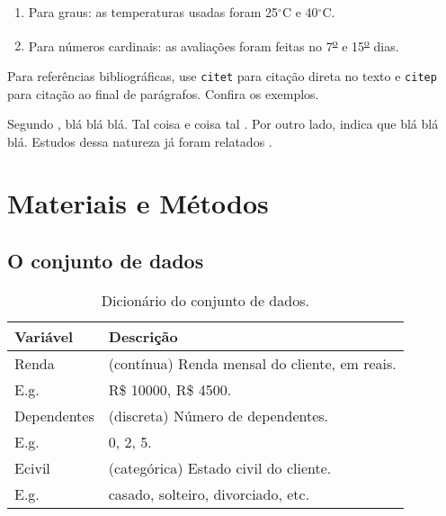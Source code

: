 \documentclass[9pt, a4paper, twocolumn]{article}
\begin{document}
\begin{enumerate}
\item Para graus: as temperaturas usadas foram 25$^{\circ}$C e 40$^{\circ}$C.
\item Para números cardinais: as avaliações foram feitas no
  7\textsuperscript{\underline{o}} e 15\textsuperscript{\underline{o}}
  dias.
\end{enumerate}

Para referências bibliográficas, use \texttt{citet} para citação direta
no texto e \texttt{citep} para citação ao final de parágrafos. Confira os
exemplos.

Segundo \citet{wickham2016r}, blá blá blá. Tal coisa e coisa tal
\citep{bruce2019estatistica}. Por outro lado, \citet{grus2019data}
indica que blá blá blá. Estudos dessa natureza já foram relatados
\citep{bruce2019estatistica, fawcett2018data}.


\section{Materiais e Métodos}

\lipsum[6]

\subsection{O conjunto de dados}

\lipsum[7]

\begin{table}[H]
  \caption{Dicionário do conjunto de dados.}
  \begin{tabular}{m{2.5cm} m{5cm}}
    \hline
    Variável & Descrição \\ \hline
    Renda & (contínua) Renda mensal do cliente, em reais. \\
    E.g. &  R\$ 10000, R\$ 4500.\\ \hline
    Dependentes & (discreta) Número de dependentes. \\
    E.g. & 0, 2, 5. \\ \hline
    Ecivil & (categórica) Estado civil do cliente. \\
    E.g. & casado, solteiro, divorciado, etc. \\ \hline
  \end{tabular}
\end{table}
\end{document}

